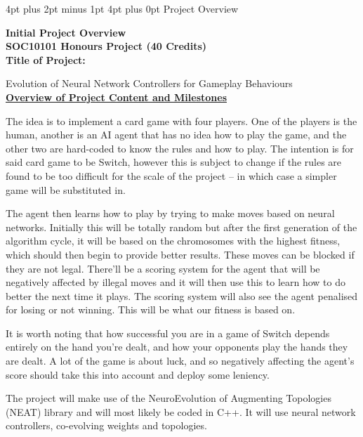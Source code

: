 \documentclass[12pt,a4paper]{article}
\makeatletter
\renewcommand\section{\@startsection {section}{1}{0mm} %
                               {4pt plus 2pt minus 1pt} %
                               {4pt plus 0pt} %
                               {\bfseries}}
\makeatother
\begin{document}
\newpage
\renewcommand{\thepage}{}
\begin{appendices}
\section{Project Overview}

\Large{\textbf{Initial Project Overview}\\

\textbf{SOC10101 Honours Project (40 Credits)}}\\                                                      

\large{\textbf{Title of Project:}}

\normalsize{Evolution of Neural Network Controllers for Gameplay Behaviours} \\

\underline{\textbf{Overview of Project Content and Milestones}}

The idea is to implement a card game with four players. One of the players is the human, another is an AI agent that has no idea how to play the game, and the other two are hard-coded to know the rules and how to play. The intention is for said card game to be Switch, however this is subject to change if the rules are found to be too difficult for the scale of the project – in which case a simpler game will be substituted in.


The agent then learns how to play by trying to make moves based on neural networks. Initially this will be totally random but after the first generation of the algorithm cycle, it will be based on the chromosomes with the highest fitness, which should then begin to provide better results. These moves can be blocked if they are not legal. There'll be a scoring system for the agent that will be negatively affected by illegal moves and it will then use this to learn how to do better the next time it plays. The scoring system will also see the agent penalised for losing or not winning. This will be what our fitness is based on. 


It is worth noting that how successful you are in a game of Switch depends entirely on the hand you’re dealt, and how your opponents play the hands they are dealt. A lot of the game is about luck, and so negatively affecting the agent’s score should take this into account and deploy some leniency. 


The project will make use of the NeuroEvolution of Augmenting Topologies (NEAT) library and will most likely be coded in C++. It will use neural network controllers, co-evolving weights and topologies. \\


\end{appendices}
\end{document}
